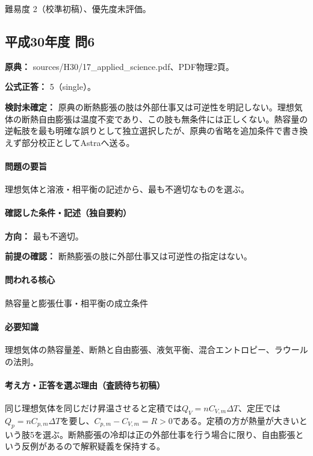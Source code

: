 \par 難易度 2（校準初稿）、優先度未評価。

\subsection{平成30年度 問6}
\label{q:h30-reg-applied-06}

\noindent\textbf{原典：} sources/H30/17\_applied\_science.pdf、PDF物理2頁。

\textbf{公式正答：} 5（single）。

\par\textbf{検討未確定：} 原典の断熱膨張の肢は外部仕事又は可逆性を明記しない。理想気体の断熱自由膨張は温度不変であり、この肢も無条件には正しくない。熱容量の逆転肢を最も明確な誤りとして独立選択したが、原典の省略を追加条件で書き換えず部分校正としてAstraへ送る。

\paragraph{問題の要旨} 理想気体と溶液・相平衡の記述から、最も不適切なものを選ぶ。

\paragraph{確認した条件・記述（独自要約）}\mbox{}\par

\noindent\textbf{方向：} 最も不適切。\par

\noindent\textbf{前提の確認：} 断熱膨張の肢に外部仕事又は可逆性の指定はない。\par

\paragraph{問われる核心} 熱容量と膨張仕事・相平衡の成立条件

\paragraph{必要知識} 理想気体の熱容量差、断熱と自由膨張、液気平衡、混合エントロピー、ラウールの法則。

\paragraph{考え方・正答を選ぶ理由（査読待ち初稿）} 同じ理想気体を同じだけ昇温させると定積では\(Q_V=nC_{V,m}\Delta T\)、定圧では\(Q_p=nC_{p,m}\Delta T\)を要し、\(C_{p,m}-C_{V,m}=R>0\)である。定積の方が熱量が大きいという肢5を選ぶ。断熱膨張の冷却は正の外部仕事を行う場合に限り、自由膨張という反例があるので解釈疑義を保持する。

